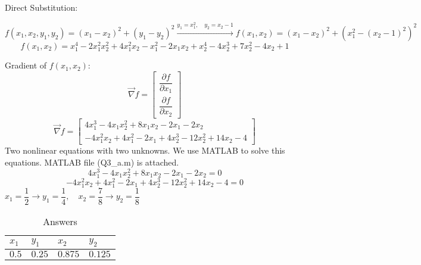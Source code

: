 Direct Substitution:



$f(x_1, x_2, y_1, y_2) = (x_1- x_2)^2 + (y_1 - y_2)^2 \xrightarrow{y_1 = x_1^2, \quad y_2 = x_2-1} f(x_1, x_2) = (x_1- x_2)^2 + (x_1^2 - (x_2-1)^2)^2$
$$f(x_1, x_2) = x_1^4 - 2x_1^2x_2^2 + 4x_1^2x_2 - x_1^2 - 2x_1x_2 + x_2^4 - 4x_2^3 + 7x_2^2 - 4x_2 + 1$$


Gradient of $f(x_1, x_2)$:
$$\vec{\nabla} f = \begin{bmatrix}
	\dfrac{\partial f}{\partial x_1} \\[6pt]
	\dfrac{\partial f}{\partial x_2}
\end{bmatrix} $$
$$\vec{\nabla} f = \begin{bmatrix}
	4x_1^3 - 4x_1x_2^2 + 8x_1x_2 - 2x_1 - 2x_2 \\
	- 4x_1^2x_2 + 4x_1^2 - 2x_1 + 4x_2^3 - 12x_2^2 + 14x_2 - 4
\end{bmatrix} $$
Two nonlinear equations with two unknowns. We use MATLAB to solve this equations. MATLAB file (Q3\_a.m) is attached.
$$	4x_1^3 - 4x_1x_2^2 + 8x_1x_2 - 2x_1 - 2x_2 =  0 $$
$$- 4x_1^2x_2 + 4x_1^2 - 2x_1 + 4x_2^3 - 12x_2^2 + 14x_2 - 4 = 0$$
$x_1 = \dfrac{1}{2} \to y_1 = \dfrac{1}{4}, \quad x_2 = \dfrac{7}{8} \to y_2 = \dfrac{1}{8}$
\begin{table}[H]
	\caption {Answers} \label{ans} 
	\begin{center}
		\begin{tabular}{| l | l | l | l |}
			\hline
			$x_1$ & $y_1$ & $x_2$ & $y_2$ \TBstrut \\
			\hline
			$0.5$ & $0.25$ & $0.875$ & $0.125$ \Tstrut\\
			\hline
		\end{tabular}
	\end{center}
\end{table}


